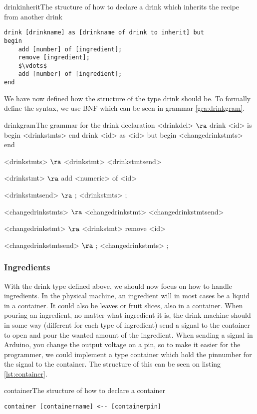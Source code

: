 \begin{code}{drinkinherit}{The structure of how to declare a drink which inherits the recipe from another drink}
\begin{lstlisting}[mathescape]
drink [drinkname] as [drinkname of drink to inherit] but
begin
	add [number] of [ingredient];
	remove [ingredient];
	$\vdots$
	add [number] of [ingredient];
end
\end{lstlisting}
\end{code}

We have now defined how the structure of the type drink should be. To formally define the syntax, we use BNF which can be seen in grammar \ref{gra:drinkgram}.

\begin{grammatik}{drinkgram}{The grammar for the drink declaration}
<drinkdcl> $\ra$ drink <id> is begin <drinkstmts> end
\alt drink <id> as <id> but begin <changedrinkstmts> end

<drinkstmts> $\ra$ <drinkstmt> <drinkstmtsend>

<drinkstmt> $\ra$ add <numeric> of <id>

<drinkstmtsend> $\ra$ ; <drinkstmts>
\alt ;

<changedrinkstmts> $\ra$ <changedrinkstmt> <changedrinkstmtsend>

<changedrinkstmt> $\ra$ <drinkstmt>
\alt remove <id>

<changedrinkstmtsend> $\ra$ ; <changedrinkstmts>
\alt ;
\end{grammatik}

\subsubsection{Ingredients}
With the drink type defined above, we should now focus on how to handle ingredients. In the physical machine, an ingredient will in most cases be a liquid in a container. It could also be leaves or fruit slices, also in a container. When pouring an ingredient, no matter what ingredient it is, the drink machine should in some way (different for each type of ingredient) send a signal to the container to open and pour the wanted amount of the ingredient. When sending a signal in Arduino, you change the output voltage on a pin, so to make it easier for the programmer, we could implement a type container which hold the pinnumber for the signal to the container. The structure of this can be seen on listing \ref{lst:container}.

\begin{code}{container}{The structure of how to declare a container}
\begin{lstlisting}[mathescape]
container [containername] <-- [containerpin]
\end{lstlisting}
\end{code}

